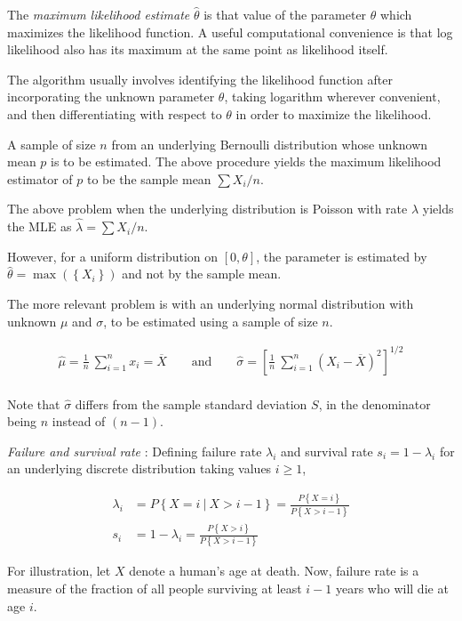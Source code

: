 The \textit{maximum likelihood estimate} $ \widehat{\theta} $ is that value of the parameter $ \theta $ which maximizes the likelihood function. A useful computational convenience is that log likelihood also has its maximum at the same point as likelihood itself.

The algorithm usually involves identifying the likelihood function after incorporating the unknown parameter $ \theta $, taking logarithm wherever convenient, and then differentiating with respect to $ \theta $ in order to maximize the likelihood.

A sample of size $ n $ from an underlying Bernoulli distribution whose unknown mean $ p $ is to be estimated. The above procedure yields the maximum likelihood estimator of $ p $ to be the sample mean $ \sum X_i / n$.

The above problem when the underlying distribution is Poisson with rate $ \lambda $ yields the MLE as $ \widehat{\lambda} =  \sum X_i / n$.

However, for a uniform distribution on $ [0, \theta] $, the parameter is estimated by $ \widehat{\theta} = \max(\left\{X_i\right\}) $ and not by the sample mean.

The more relevant problem is with an underlying normal distribution with unknown $ \mu $ and $ \sigma $, to be estimated using a sample of size $ n $.

\begin{align}
	\widehat{\mu} = \frac{1}{n}\ \sum\limits_{i=1}^{n} x_i = \overline{X} \qquad \text{and} \qquad \widehat{\sigma} = \left[\frac{1}{n}\  \sum\limits_{i=1}^{n} (X_i - \overline{X})^2 \right] ^{1/2} \\
\end{align}

Note that $ \widehat{\sigma} $ differs from the sample standard deviation $ S $, in the denominator being $ n $ instead of $ (n-1) $.

\textit{Failure and survival rate} : Defining failure rate $ \lambda_i $ and survival rate $ s_i = 1 - \lambda_i $ for an underlying discrete distribution taking values $ i \geq 1 $,

\begin{align}
	\lambda_i &= P \left\{X = i\ |\ X > i-1\right\} = \frac{P \left\{X = i\right\}}{P\left\{X > i-1\right\}} \\
	s_i &= 1 - \lambda_i = \frac{P \left\{X > i\right\}}{P\left\{X > i-1\right\}}
\end{align}

For illustration, let $ X $ denote a human's age at death. Now, failure rate is a measure of the fraction of all people surviving at least $ i-1 $ years who will die at age $ i $.

